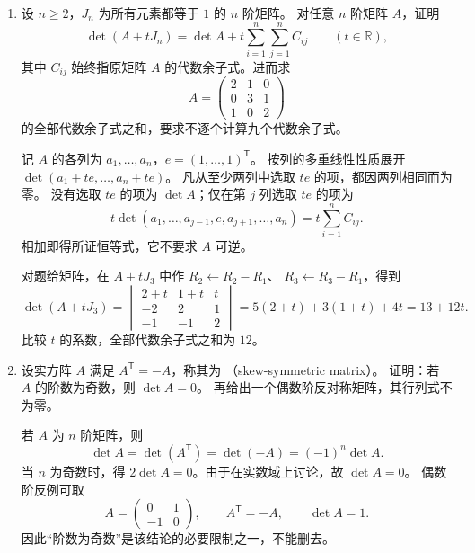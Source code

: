 \documentclass[UTF8,12pt,a4paper,fontset=fandol]{ctexart}
\begin{document}
\begin{enumerate}[label=\arabic*.,resume=detquestions]
\begin{solve}
当 $\lambda\notin\{1,-2\}$ 时，$D\ne0$，所以有唯一解。
令 $s=x+y+z$，三式可写为
\[
(\lambda-1)x+s=1,\quad
(\lambda-1)y+s=1,\quad
(\lambda-1)z+s=-2.
\]
三式相加得 $(\lambda+2)s=0$，故 $s=0$，从而
\[
\boxed{(x,y,z)=\left(\frac1{\lambda-1},\frac1{\lambda-1},
-\frac2{\lambda-1}\right).}
\]

当 $\lambda=1$ 时，前两式要求 $x+y+z=1$，第三式要求 $x+y+z=-2$，故无解。

当 $\lambda=-2$ 时，三式分别给出
$x=(s-1)/3$、$y=(s-1)/3$、$z=(s+2)/3$，它们的和恒为 $s$。
因此 $s$ 可以任取实数，全部解为
\[
\boxed{(x,y,z)=(-1/3,-1/3,2/3)+t(1,1,1),\qquad t\in\mathbb R.}
\]
两个使系数行列式为零的参数对应不同情况，不能仅凭 $D=0$ 判定无解。
\end{solve}

\item\label{q:all-cofactors}
设 $n\geq2$，$J_n$ 为所有元素都等于 $1$ 的 $n$ 阶矩阵。
对任意 $n$ 阶矩阵 $A$，证明
\[
\det(A+tJ_n)=\det A+t\sum_{i=1}^n\sum_{j=1}^n C_{ij}
\qquad(t\in\mathbb R),
\]
其中 $C_{ij}$ 始终指原矩阵 $A$ 的代数余子式。进而求
\[
A=\begin{pmatrix}2&1&0\\0&3&1\\1&0&2\end{pmatrix}
\]
的全部代数余子式之和，要求不逐个计算九个代数余子式。
\begin{solve}
记 $A$ 的各列为 $a_1,\ldots,a_n$，$e=(1,\ldots,1)^{\mathsf T}$。
按列的多重线性性质展开 $\det(a_1+te,\ldots,a_n+te)$。
凡从至少两列中选取 $te$ 的项，都因两列相同而为零。
没有选取 $te$ 的项为 $\det A$；仅在第 $j$ 列选取 $te$ 的项为
\[
t\det(a_1,\ldots,a_{j-1},e,a_{j+1},\ldots,a_n)
=t\sum_{i=1}^n C_{ij}.
\]
相加即得所证恒等式，它不要求 $A$ 可逆。

对题给矩阵，在 $A+tJ_3$ 中作 $R_2\leftarrow R_2-R_1$、
$R_3\leftarrow R_3-R_1$，得到
\[
\det(A+tJ_3)=
\begin{vmatrix}2+t&1+t&t\\-2&2&1\\-1&-1&2\end{vmatrix}
=5(2+t)+3(1+t)+4t=13+12t.
\]
比较 $t$ 的系数，全部代数余子式之和为 $\boxed{12}$。
\end{solve}

\item\label{q:skew-symmetric}
设实方阵 $A$ 满足 $A^{\mathsf T}=-A$，称其为
（skew-symmetric matrix）。
证明：若 $A$ 的阶数为奇数，则 $\det A=0$。
再给出一个偶数阶反对称矩阵，其行列式不为零。
\begin{solve}
若 $A$ 为 $n$ 阶矩阵，则
\[
\det A=\det(A^{\mathsf T})=\det(-A)=(-1)^n\det A.
\]
当 $n$ 为奇数时，得 $2\det A=0$。由于在实数域上讨论，故 $\det A=0$。
偶数阶反例可取
\[
A=\begin{pmatrix}0&1\\-1&0\end{pmatrix},
\qquad A^{\mathsf T}=-A,\qquad\det A=1.
\]
因此“阶数为奇数”是该结论的必要限制之一，不能删去。
\end{solve}


\end{enumerate}
\end{document}
